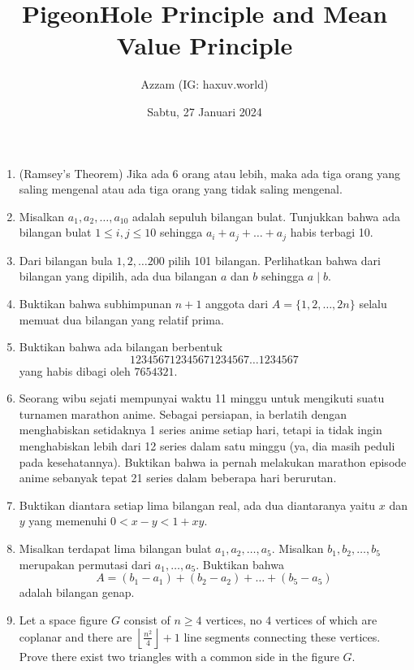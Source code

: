 \documentclass[11pt]{scrartcl}
\title{PigeonHole Principle and Mean Value Principle}
\author{Azzam (IG: haxuv.world)}
\date{Sabtu, 27 Januari 2024}
\begin{document}
\maketitle
\begin{enumerate}
    \item (Ramsey's Theorem) Jika ada 6 orang atau lebih, maka ada tiga orang yang saling mengenal atau ada tiga orang yang tidak saling mengenal.

    \item Misalkan $a_1, a_2, \dots, a_{10}$ adalah sepuluh bilangan bulat. Tunjukkan bahwa ada bilangan bulat $1 \le i,j \le 10$ sehingga $a_i+a_j+\dots+a_j$ habis terbagi 10.

    \item Dari bilangan bula $1,2,\dots 200$ pilih 101 bilangan. Perlihatkan bahwa dari bilangan yang dipilih, ada dua bilangan $a$ dan $b$ sehingga $a \mid b$.

    \item Buktikan bahwa subhimpunan $n+1$ anggota dari $A=\{1,2,\dots, 2n\}$ selalu memuat dua bilangan yang relatif prima.

    \item Buktikan bahwa ada bilangan berbentuk $$123456712345671234567\dots1234567$$
    yang habis dibagi oleh $7654321$.

    \item Seorang wibu sejati mempunyai waktu 11 minggu untuk mengikuti suatu turnamen marathon anime. Sebagai persiapan, ia berlatih dengan menghabiskan setidaknya 1 series anime setiap hari, tetapi ia tidak ingin menghabiskan lebih dari 12 series dalam satu minggu (ya, dia masih peduli pada kesehatannya). Buktikan bahwa ia pernah melakukan marathon episode anime sebanyak tepat 21 series dalam beberapa hari berurutan.

    \item Buktikan diantara setiap lima bilangan real, ada dua diantaranya yaitu $x$ dan $y$ yang memenuhi $0 < x-y < 1+xy$.

    \item Misalkan terdapat lima bilangan bulat $a_1, a_2, \dots, a_5$. Misalkan $b_1,b_2,\dots,b_5$ merupakan permutasi dari $a_1,\dots,a_5$. Buktikan bahwa 
    $$A=(b_1-a_1)+(b_2-a_2)+\dots+(b_5-a_5)$$ adalah bilangan genap.

    \item Let a space figure $G$ consist of $n \ge 4$ vertices, no $4$ vertices of which are coplanar and there are $\left\lfloor \frac{n^2}{4} \right\rfloor + 1$ line segments connecting these vertices. Prove there exist two triangles with a common side in the figure $G$.
    

\end{enumerate}
\end{document}
